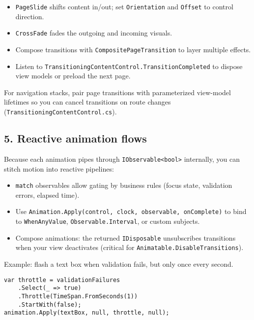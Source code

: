 \begin{itemize}
\tightlist
\item
  \passthrough{\lstinline!PageSlide!} shifts content in/out; set
  \passthrough{\lstinline!Orientation!} and
  \passthrough{\lstinline!Offset!} to control direction.
\item
  \passthrough{\lstinline!CrossFade!} fades the outgoing and incoming
  visuals.
\item
  Compose transitions with
  \passthrough{\lstinline!CompositePageTransition!} to layer multiple
  effects.
\item
  Listen to
  \passthrough{\lstinline!TransitioningContentControl.TransitionCompleted!}
  to dispose view models or preload the next page.
\end{itemize}

For navigation stacks, pair page transitions with parameterized
view-model lifetimes so you can cancel transitions on route changes
(\passthrough{\lstinline!TransitioningContentControl.cs!}).

\subsection{5. Reactive animation flows}\label{reactive-animation-flows}

Because each animation pipes through
\passthrough{\lstinline!IObservable<bool>!} internally, you can stitch
motion into reactive pipelines:

\begin{itemize}
\tightlist
\item
  \passthrough{\lstinline!match!} observables allow gating by business
  rules (focus state, validation errors, elapsed time).
\item
  Use
  \passthrough{\lstinline!Animation.Apply(control, clock, observable, onComplete)!}
  to bind to \passthrough{\lstinline!WhenAnyValue!},
  \passthrough{\lstinline!Observable.Interval!}, or custom subjects.
\item
  Compose animations: the returned \passthrough{\lstinline!IDisposable!}
  unsubscribes transitions when your view deactivates (critical for
  \passthrough{\lstinline!Animatable.DisableTransitions!}).
\end{itemize}

Example: flash a text box when validation fails, but only once every
second.

\begin{lstlisting}
var throttle = validationFailures
    .Select(_ => true)
    .Throttle(TimeSpan.FromSeconds(1))
    .StartWith(false);
animation.Apply(textBox, null, throttle, null);
\end{lstlisting}

